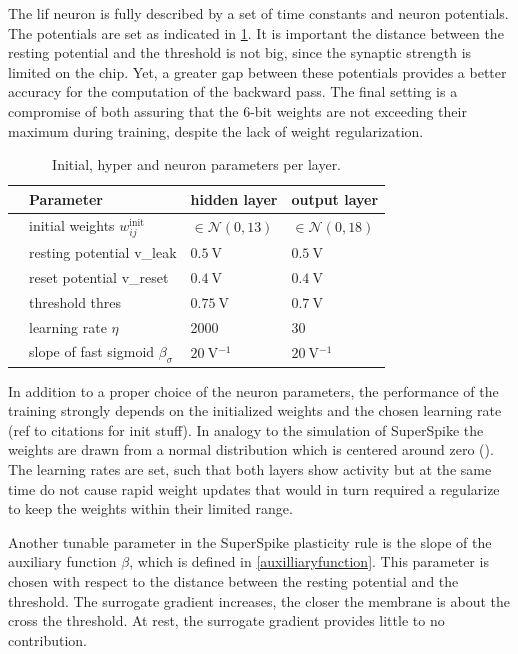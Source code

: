 The \gls{lif} neuron is fully described by a set of time constants and neuron potentials. The potentials are set as indicated in \cref{initparameters}. It is important the distance between the resting potential and the threshold is not big, since the synaptic strength is limited on the chip. Yet, a greater gap between these potentials provides a better accuracy for the computation of the backward pass. The final setting is a compromise of both assuring that the 6-bit weights are not exceeding their maximum during training, despite the lack of weight regularization.

\begin{table}[htb!]\centering{}
	\begin{tabular}{@{}rlll@{}}\toprule
		& Parameter								& 	hidden layer 			& 	output layer \\ \midrule
		& initial weights $w_{ij}^\text{init}$	& 	$\in \mathcal{N}(0,13)$ & 	$\in \mathcal{N}(0,18)$\\
		& resting potential \gls{v_leak}		&	$\SI{0.5}{\V}$ 			& 	$\SI{0.5}{\V}$\\
		& reset potential \gls{v_reset}			&	$\SI{0.4}{\V}$			& 	$\SI{0.4}{\V}$\\
		& threshold \gls{thres} 				&	$\SI{0.75}{\V}$			& 	$\SI{0.7}{\V}$\\
		& learning rate $\eta$ 					&	2000					& 	30			\\
		& slope of fast sigmoid $\beta_\sigma$ 	&	$\SI{20}{\V^{-1}}$		& 	$\SI{20}{\V^{-1}}$	\\
		\bottomrule
	\end{tabular}
	\caption[Initial, hyper and neuron parameters per layer.]{Initial, hyper and neuron parameters per layer.}
	\label{initparameters}
\end{table}

In addition to a proper choice of the neuron parameters, the performance of the training strongly depends on the initialized weights and the chosen learning rate (ref to citations for init stuff). In analogy to the simulation of SuperSpike the weights are drawn from a normal distribution which is centered around zero (\citealp{zenke2018superspike}). The learning rates are set, such that both layers show activity but at the same time do not cause rapid weight updates that would in turn required a regularize to keep the weights within their limited range.



Another tunable parameter in the SuperSpike plasticity rule is the slope of the auxiliary function $\beta$, which is defined in \cref{auxilliaryfunction}. This parameter is chosen with respect to the distance between the resting potential and the threshold. The surrogate gradient increases, the closer the membrane is about the cross the threshold. At rest, the surrogate gradient provides little to no contribution. 



